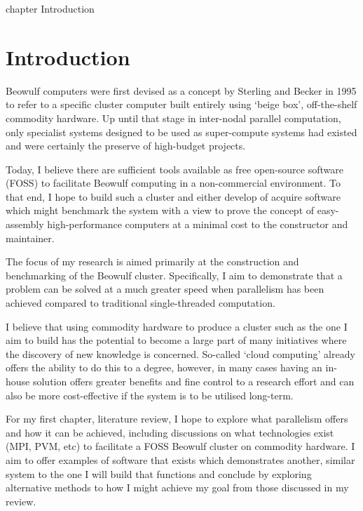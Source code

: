 \cleardoublepage
{}
{}
    {chapter}
    {Introduction}

\chapter*{Introduction}

\textbf{}

Beowulf computers were first devised as a concept by Sterling and Becker in 1995 \cite{sterling_1995} to refer to a specific cluster computer built entirely using `beige box', off-the-shelf commodity hardware.  Up until that stage in inter-nodal parallel computation, only specialist systems designed to be used as super-compute systems had existed and were certainly the preserve of high-budget projects.

Today, I believe there are sufficient tools available as free open-source software (FOSS) to facilitate Beowulf computing in a non-commercial environment. To that end, I hope to build such a cluster and either develop of acquire software which might benchmark the system with a view to prove the concept of easy-assembly high-performance computers at a minimal cost to the constructor and maintainer. 

The focus of my research is aimed primarily at the construction and benchmarking of the Beowulf cluster. Specifically, I aim to demonstrate that a problem can be solved at a much greater speed when parallelism has been achieved compared to traditional single-threaded computation.

I believe that using commodity hardware to produce a cluster such as the one I aim to build has the potential to become a large part of many initiatives where the discovery of new knowledge is concerned. So-called `cloud computing' already offers the ability to do this to a degree, however, in many cases having an in-house solution offers greater benefits and fine control to a research effort and can also be more cost-effective if the system is to be utilised long-term.

\textbf{}

For my first chapter, literature review, I hope to explore what parallelism offers and how it can be achieved, including discussions on what technologies exist (MPI, PVM, etc) to facilitate a FOSS Beowulf cluster on commodity hardware. I aim to offer examples of software that exists which demonstrates another, similar system to the one I will build that functions and conclude by exploring alternative methods to how I might achieve my goal from those discussed in my review.

